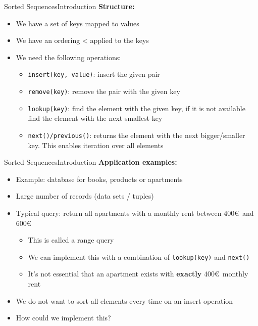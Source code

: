 
\begin{frame}{Sorted Sequences}{Introduction}
  \textbf{Structure:}
  \begin{itemize}
    \item<2->
      We have a set of {\color{MainA}keys} mapped to
      {\color{MainA}values}
    \item<3->
      We have an ordering {\color{MainA}<} applied to the keys
    \item<4->
      We need the following operations:
      \begin{itemize}
      \item<5->{\color{MainA}\texttt{insert(key, value)}}:
        insert the given pair
      \item<6->{\color{MainA}\texttt{remove(key)}}:
        remove the pair with the given {\color{MainA}key}
      \item<7->{\color{MainA}\texttt{lookup(key)}}:
        find the element with the given {\color{MainA}key},
        if it is not available find the element with the next smallest key
      \item<8->{\color{MainA}\texttt{next()/previous()}}:
        returns the element with the next bigger/smaller {\color{MainA}key}.
        This enables iteration over all elements
      \end{itemize}
  \end{itemize}
\end{frame}


\begin{frame}{Sorted Sequences}{Introduction}
  \textbf{Application examples:}
  \begin{itemize}
    \item<2->
      Example: database for books, products or apartments
    \item<3->
      Large number of records (data sets / tuples)
    \item<4->
      Typical query: return all apartments with a monthly rent between
      400\euro\, and 600\euro
      \begin{itemize}
        \item<5->
          This is called a {\color{MainA}range query}
        \item<6->
          We can implement this with a combination of
          {\color{MainA}\texttt{lookup(key)}} and
          {\color{MainA}\texttt{next()}}
        \item<7->
          It's not essential that an apartment exists with \textbf{exactly}
          400\euro\, monthly rent
      \end{itemize}
    \item<8->
      We do not want to sort all elements every time on an 
      {\color{MainA}insert} operation
     \item<9->
      How could we implement this?
  \end{itemize}
\end{frame}

